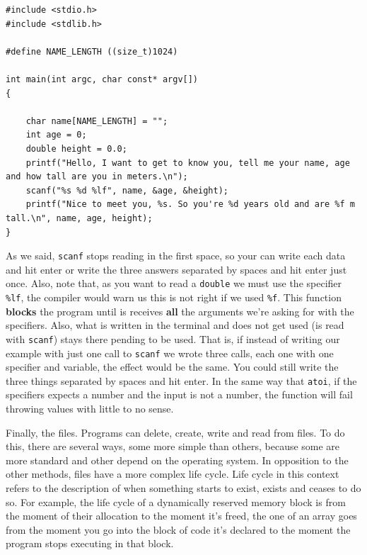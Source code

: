 \documentclass[a4paper]{article}
\begin{document}
\noindent
\begin{minipage}[H]{\linewidth}
\mbox{}
\begin{lstlisting}[style=C,
caption={\texttt{scanf} advanced example},
label={lst:scanfExample}]
#include <stdio.h>
#include <stdlib.h>

#define NAME_LENGTH ((size_t)1024)

int main(int argc, char const* argv[])
{

    char name[NAME_LENGTH] = "";
    int age = 0;
    double height = 0.0;
    printf("Hello, I want to get to know you, tell me your name, age and how tall are you in meters.\n");
    scanf("%s %d %lf", name, &age, &height);
    printf("Nice to meet you, %s. So you're %d years old and are %f m tall.\n", name, age, height);
}
\end{lstlisting}
\end{minipage}

As we said, \verb!scanf! stops reading in the first space, so your can write
each data and hit enter or write the three answers separated by spaces and hit
enter just once. Also, note that, as you want to read a \verb!double! we must
use the specifier \verb!%lf!, the
compiler would warn us this is not right if we used \verb!%f!. This function
\textbf{blocks} the program until is receives \textbf{all} the arguments we're
asking for with the specifiers. Also, what is written in the terminal and does
not get used (is read with \verb!scanf!) stays there pending to be used. That
is, if instead of writing our example with just one call to \verb!scanf! we
wrote three calls, each one with one specifier and variable, the effect would be
the same. You could still write the three things separated by spaces and hit
enter. In the same way that \verb!atoi!, if the specifiers expects a number and
the input is not a number, the function will fail throwing values with little to
no sense.

Finally, the files. Programs can delete, create, write and read from files.
To do this, there are several ways, some more simple than others, because some
are more standard and other depend on the operating system. In opposition to the
other methods, files have a more complex life cycle. Life cycle in this context
refers to the description of when something starts to exist, exists and ceases
to do so. For example, the life cycle of a dynamically reserved memory block is
from the moment of their allocation to the moment it's freed, the one of an
array goes from the moment you go into the block of code it's declared to the
moment the program stops executing in that block.
\end{document}
